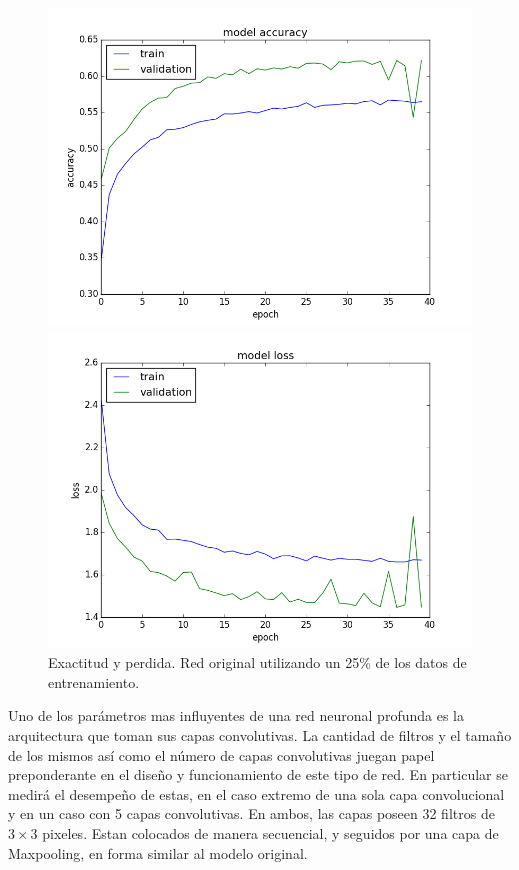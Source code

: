 \documentclass{article}[12pt, a4paper]
\begin{document}
\begin{figure}[h!]
	\begin{minipage}[h]{0.49\textwidth}
		\includegraphics[width=\textwidth]{ej3acc}
	\end{minipage}
	\begin{minipage}[h]{0.49\textwidth}
		\includegraphics[width=\textwidth]{ej3loss}
	\end{minipage}
	\caption{Exactitud y perdida. Red original utilizando un 25\% de los datos de entrenamiento.}
	\label{ej3a}
\end{figure}

Uno de los par\'ametros mas influyentes de una red neuronal profunda es la arquitectura
que toman sus capas convolutivas. La cantidad de filtros y el tama\~no de los mismos as\'i
como el n\'umero de capas convolutivas juegan papel preponderante en el dise\~no y funcionamiento
de este tipo de red. En particular se medir\'a el desempeño de estas, en el caso extremo de una
sola capa convolucional y en un caso con 5 capas convolutivas. En ambos, las capas poseen 32 filtros
de $3\times3$ pixeles. Estan colocados de manera secuencial, y seguidos por una capa de Maxpooling,
en forma similar al modelo original.
\end{document}

